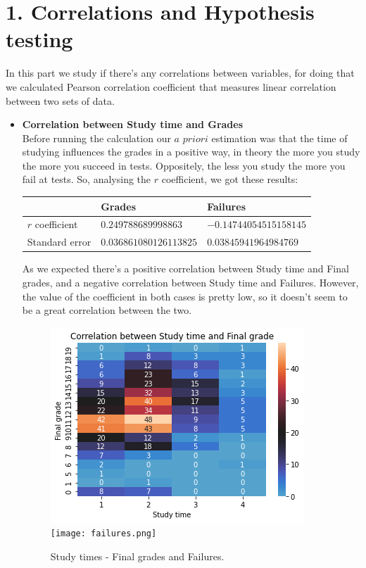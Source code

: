 \documentclass[a4paper, 11pt]{report}
\theoremstyle{definition}
\numberwithin{equation}{section}		%
\numberwithin{figure}{section}			%
\numberwithin{table}{section}				%
\begin{document}
\section*{1. Correlations and Hypothesis testing}
In this part we study if there's any correlations between variables, for doing that we calculated Pearson correlation coefficient that measures linear correlation between two sets of data.

\begin{itemize}
\item \textbf{Correlation between Study time and Grades}
\\Before running the calculation our $a$ $priori$ estimation was that the time of studying influences the grades in a positive way, in theory the more you study the more you succeed in tests. Oppositely, the less you study the more you fail at tests. So, analysing the $r$ coefficient, we got these results:
\begin{center}
\begin{tabular}{|p{3cm}|p{4cm}|p{4cm}|}
 & Grades & Failures\\
\hline
$r$ coefficient & $0.249788689998863$ & $-0.14744054515158145$\\
\hline
Standard error & $0.036861080126113825$ & $0.03845941964984769$\\
\hline
\end{tabular}
\end{center}

As we expected there's a positive correlation between Study time and Final grades, and a negative correlation between Study time and Failures. However, the value of the coefficient in both cases is pretty low, so it doesn't seem to be a great correlation between the two. 

\begin{figure}[h]\centering
\includegraphics[scale=0.42]{g3-st.png}\quad\texttt{[image: failures.png]}
\caption{Study times - Final grades and Failures.}
\end{figure}


\end{itemize}
\end{document}
